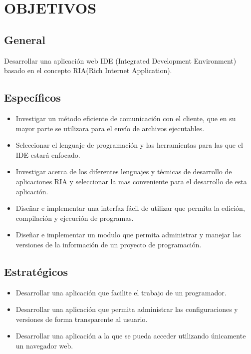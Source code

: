 \section{OBJETIVOS}

\subsection{General}

Desarrollar una aplicación web IDE (Integrated Development Environment) basado en el concepto RIA(Rich Internet Application).

\subsection{Específicos}

\begin{itemize}
	
	\item Investigar un método eficiente de comunicación con el cliente, que en su mayor parte se utilizara para el envío de archivos ejecutables.
	
	\item Seleccionar el lenguaje de programación y las herramientas para las que el IDE estará enfocado.
	
	\item Investigar acerca de los diferentes lenguajes y técnicas de desarrollo de aplicaciones RIA y seleccionar la mas conveniente para el desarrollo de esta aplicación.
	
	\item Diseñar e implementar una interfaz fácil de utilizar que permita la edición, compilación y ejecución de programas.
	
	\item Diseñar e implementar un modulo que permita administrar y manejar las versiones de la información de un proyecto de programación.
	
\end{itemize}


\subsection{Estratégicos}

\begin{itemize}

	\item Desarrollar una aplicación que facilite el trabajo de un programador.
	
	\item Desarrollar una aplicación que permita administrar las configuraciones y versiones de forma transparente al usuario.
	
	\item Desarrollar una aplicación a la que se pueda acceder utilizando únicamente un navegador web.
	
\end{itemize}
